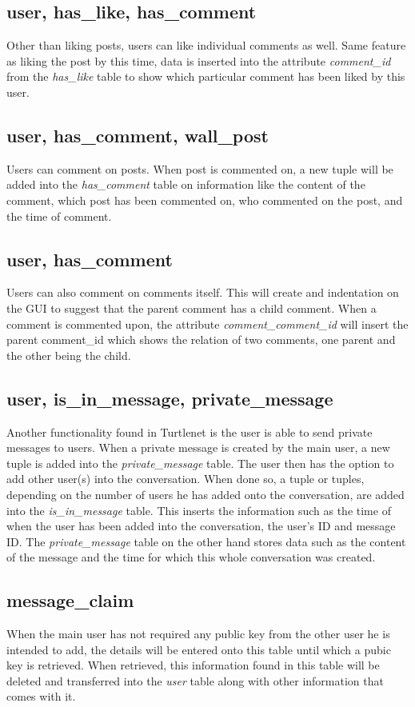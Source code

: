 \subsection{user, has\_like, has\_comment}
Other than liking posts, users can like individual comments as well. Same feature as liking the post by this time, data is inserted into the attribute {\it comment\_id} from the {\it has\_like} table to show which particular comment has been liked by this user.

\subsection{user, has\_comment, wall\_post}
Users can comment on posts. When post is commented on, a new tuple will be added into the {\it has\_comment} table on information like the content of the comment, which post has been commented on, who commented on the post, and the time of comment.

\subsection{user, has\_comment}
Users can also comment on comments itself. This will create and indentation on the GUI to suggest that the parent comment has a child comment. When a comment is commented upon, the attribute {\it comment\_comment\_id} will insert the parent comment\_id which shows the relation of two comments, one parent and the other being the child.

\subsection{user, is\_in\_message, private\_message}
Another functionality found in Turtlenet is the user is able to send private messages to users. When a private message is created by the main user, a new tuple is added into the {\it private\_message} table. The user then has the option to add other user(s) into the conversation. When done so, a tuple or tuples, depending on the number of users he has added onto the conversation, are added into the {\it is\_in\_message} table. This inserts the information such as the time of when the user has been added into the conversation, the user's ID and message ID. The {\it private\_message} table on the other hand stores data such as the content of the message and the time for which this whole conversation was created. 

\subsection{message\_claim}
When the main user has not required any public key from the other user he is intended to add, the details will be entered onto this table until which a pubic key is retrieved. When retrieved, this information found in this table will be deleted and transferred into the {\it user} table along with other information that comes with it.


